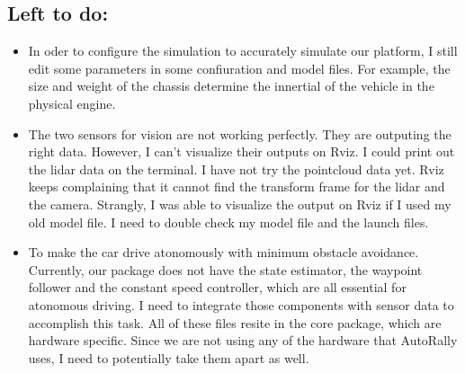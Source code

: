 \documentclass[compsoc,draftclsnofoot,onecolumn,10pt]{IEEEtran}
\begin{document}
\subsection{Left to do:}
\begin{itemize}
	\item In oder to configure the simulation to accurately simulate our platform, I still edit some parameters in some confiuration and model files. For example, the size and weight of the chassis determine the innertial of the vehicle in the physical engine.  
	\item The two sensors for vision are not working perfectly. They are outputing the right data. However, I can't visualize their outputs on Rviz. I could print out the lidar data on the terminal. I have not try the pointcloud data yet. Rviz keeps complaining that it cannot find the transform frame for the lidar and the camera. Strangly, I was able to visualize the output on Rviz if I used my old model file. I need to double check my model file and the launch files. 
	\item To make the car drive atonomously with minimum obstacle avoidance. Currently, our package does not have the state estimator, the waypoint follower and the constant speed controller, which are all essential for atonomous driving. I need to integrate those components with sensor data to accomplish this task. All of these files resite in the core package, which are hardware specific. Since we are not using any of the hardware that AutoRally uses, I need to potentially take them apart as well. 
\end{itemize}
\end{document}

